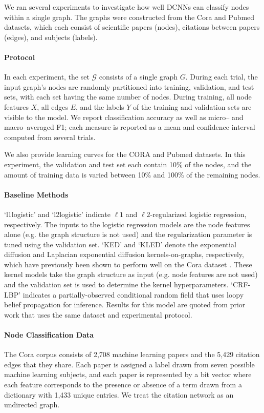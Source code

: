 \documentclass{article}
\begin{document}
We ran several experiments to investigate how well DCNNs can classify nodes within a single graph.  The graphs were constructed from the Cora and Pubmed datasets, which each consist of scientific papers (nodes), citations between papers (edges), and subjects (labels).

\paragraph{Protocol} In each experiment, the set $\mathcal{G}$ consists of a single graph $G$.  During each trial, the input graph's nodes are randomly partitioned into training, validation, and test sets, with each set having the same number of nodes.  During training, all node features $X$, all edges $E$, and the labels $Y$ of the training and validation sets are visible to the model. We report classification accuracy as well as micro-- and macro--averaged F1; each measure is reported as a mean and confidence interval computed from several trials.

We also provide learning curves for the CORA and Pubmed datasets.  In this experiment, the validation and test set each contain 10\% of the nodes, and the amount of training data is varied between 10\% and 100\% of the remaining nodes.

\paragraph{Baseline Methods} `l1logistic' and `l2logistic' indicate $\ell 1$ and $\ell 2$-regularized logistic regression, respectively.  The inputs to the logistic regression models are the node features alone (e.g. the graph structure is not used) and the regularization parameter is tuned using the validation set.  `KED' and `KLED' denote the exponential diffusion and Laplacian exponential diffusion kernels-on-graphs, respectively, which have previously been shown to perform well on the Cora dataset \cite{Fouss:2012bf}.  These kernel models take the graph structure as input (e.g. node features are not used) and the validation set is used to determine the kernel hyperparameters.  `CRF-LBP' indicates a partially-observed conditional random field that uses loopy belief propagation for inference.  Results for this model are quoted from prior work \cite{Sen:2007wh} that uses the same dataset and experimental protocol.

\paragraph{Node Classification Data} The Cora corpus \cite{sen:aimag08} consists of 2,708 machine learning papers and the 5,429 citation edges that they share.  Each paper is assigned a label drawn from seven possible machine learning subjects, and each paper is represented by a bit vector where each feature corresponds to the presence or absence of a term drawn from a dictionary with 1,433 unique entries.  We treat the citation network as an undirected graph.
\end{document}

